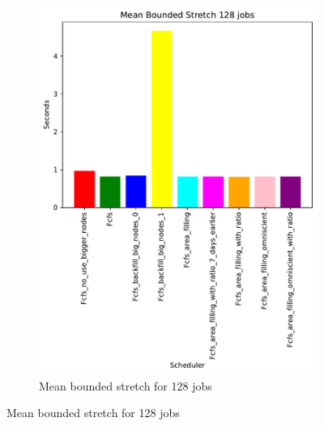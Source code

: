 \documentclass[a4paper]{article}
\begin{document}
\begin{figure}[H]
\begin{subfigure}[b]{0.4\linewidth}\centering\includegraphics[width=0.95\linewidth]{MBSS/plot/Size_Constraint_2022-01-17->2022-01-17_V9271_Mean_Stretch_With_a_Minimum_128_450_128_32_256_4_1024.pdf}\caption{Mean bounded stretch for 128 jobs}\label{45}\end{subfigure}

\end{figure}
\end{document}
